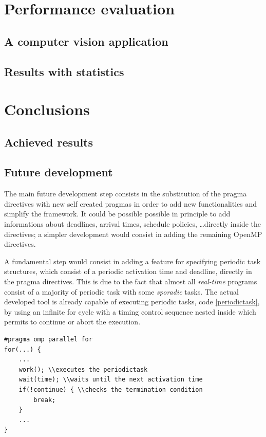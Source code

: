 \documentclass[a4paper,11pt,oneside]{book}
\begin{document}
\chapter{Performance evaluation}
\section{A computer vision application}
\section{Results with statistics}

\chapter{Conclusions}
\section{Achieved results}
\section{Future development}

The main future development step consists in the substitution of the pragma directives with new self created pragmas in order to add new functionalities and simplify the framework. It could be possible possible in principle to add informations about deadlines, arrival times, schedule policies, \dots directly inside the directives; a simpler development would consist in adding the remaining OpenMP directives. 

A fundamental step would consist in adding a feature for specifying periodic task structures, which consist of a periodic activation time and deadline, directly in the pragma directives. This is due to the fact that almost all \emph{real-time} programs consist of a majority of periodic task with some \emph{sporadic} tasks. The actual developed tool is already capable of executing periodic tasks, code \ref{periodictask}, by using an infinite for cycle with a timing control sequence nested inside which permits to continue or abort the execution. 


\begin{lstlisting}[language=CCC, caption=Example of a periodic task., label=periodictask]
#pragma omp parallel for
for(...) {
	...
	work(); \\executes the periodictask
	wait(time); \\waits until the next activation time
	if(!continue) { \\checks the termination condition
		break;
	}
	...
}

\end{lstlisting}
\end{document}
